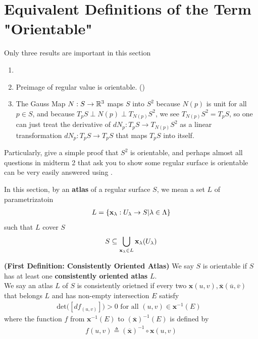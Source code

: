 \documentclass{report}
\begin{document}
\section{Equivalent Definitions of the Term "Orientable"}
\begin{mdframed}
Only three results are important in this section 
\begin{enumerate}[label=(\alph*)]
  \item {}
  \item Preimage of regular value is orientable. ()
  \item The Gauss Map $N:S\rightarrow \mathbb{R}^3$ maps $S$ into  $S^2$ because  $N(p)$ is unit for all $p\in  S$, and because $T_pS\perp N(p)\perp T_{N(p)}S^2$, we see $T_{N(p)}S^2=T_pS$, so one can just treat the derivative of $dN_p:T_{p}S\rightarrow T_{N(p)}S^2$ as a linear transformation $dN_p:T_pS\rightarrow T_pS$ that maps $T_pS$ into itself. 
\end{enumerate}
Particularly,  give a simple proof that $S^2$ is orientable, and perhaps almost all questions in midterm 2 that ask you to show some regular surface is orientable can be very easily answered using .
\end{mdframed}
\begin{mdframed}
In this section, by an \textbf{atlas} of a regular surface $S$, we mean a set $L$ of parametrizatoin
 \begin{align*}
L=\{ \textbf{x}_\lambda  :U_\lambda  \rightarrow S|\lambda  \in \Lambda  \}
\end{align*}
such that  $L$ cover  $S$ 
 \begin{align*}
S\subseteq \bigcup_{\textbf{x}_\lambda \in L} \textbf{x}_\lambda  (U_\lambda ) 
\end{align*}
\end{mdframed}
\begin{definition}
\label{FD}
\textbf{(First Definition: Consistently Oriented Atlas)} We say $S$ is orientable if $S$ has at least one  \textbf{consistently oriented atlas} $L$.\\



We say an atlas $L$ of  $S$ is consistently orietned if every two  $\textbf{x}(u,v),\overline{\textbf{x}}(\overline{u},\overline{v})$ that belongs $L$ and has non-empty intersection $E$ satisfy 
\begin{align*}
  \text{det}\Big([df_{(u,v)}]\Big)>0\text{ for all $(u,v) \in \textbf{x}^{-1}(E)$ }
\end{align*}
where the function $f$ from $\textbf{x}^{-1}(E)$ to $(\overline{\textbf{x}})^{-1}(E)$ is defined by 
\begin{align*}
f(u,v)\triangleq (\overline{\textbf{x}})^{-1}\circ \textbf{x}(u,v)
\end{align*}
\end{definition}
\end{document}
